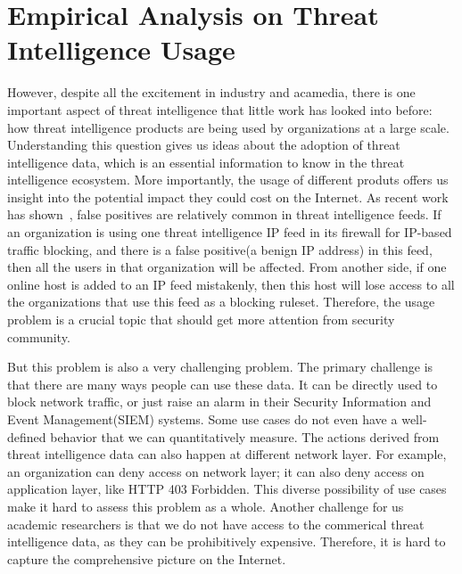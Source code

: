 \section{Empirical Analysis on Threat Intelligence Usage}

However, despite all the excitement in industry and acamedia, there is one
important aspect of threat intelligence that little work has looked into before:
how threat intelligence products are being used by organizations at a large scale.
Understanding this question gives us ideas about the adoption of threat
intelligence data, which is an essential information to know in the threat
intelligence ecosystem. More importantly, the usage of different produts offers
us insight into the potential impact they could cost on the Internet.
As recent work has shown~\cite{li2019reading}, false positives are relatively
common in threat intelligence feeds. If an organization is using one threat
intelligence IP feed in its firewall for IP-based traffic blocking, and there
is a false positive(a benign IP address) in this feed, then all the users in
that organization will be affected. From another side, if one online host is
added to an IP feed mistakenly, then this host will lose access to all the
organizations that use this feed as a blocking ruleset. Therefore, the usage
problem is a crucial topic that should get more attention from security community.

But this problem is also a very challenging problem. The primary challenge 
is that there are many ways people can use these data. It can be directly 
used to block network traffic, or just raise an alarm in their Security
Information and Event Management(SIEM) systems. Some use cases do not even 
have a well-defined behavior that we can quantitatively measure. 
The actions derived from threat intelligence data can also happen at different
network layer. For example, an organization can deny access on network layer; 
it can also deny access on application layer, like HTTP 403 Forbidden. 
This diverse possibility of use cases make it hard to assess this problem as 
a whole. Another challenge for us academic researchers is that we do not have 
access to the commerical threat intelligence data, as they can be prohibitively
expensive. Therefore, it is hard to capture the comprehensive picture on the
Internet.

